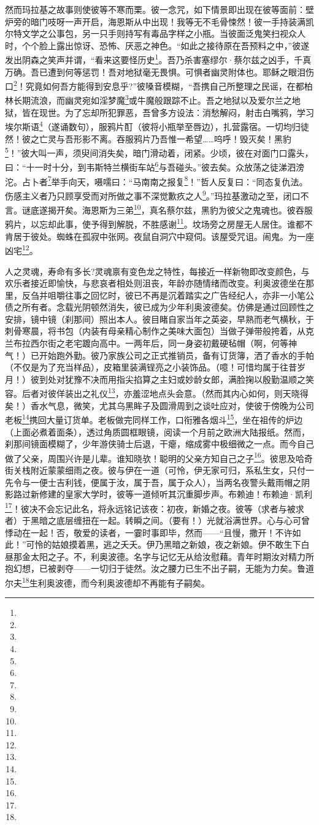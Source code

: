 \par 然而玛拉基之故事则使彼等不寒而栗。彼一念咒，如下情景即出现在彼等面前：壁炉旁的暗门吱呀一声开启，海恩斯从中出现！我等无不毛骨悚然！彼一手持装满凯尔特文学之公事包，另一只手则持写有毒品字样之小瓶。当彼面泛鬼笑扫视众人时，个个脸上露出惊讶、恐怖、厌恶之神色。“如此之接待原在吾预料之中，”彼遂发出阴森之笑声并谓，“看来这要怪历史\footnote{}。吾乃杀害塞缪尔·蔡尔兹之凶手，千真万确。吾已遭到何等惩罚！吾对地狱毫无畏惧。可惧者幽灵附体也。耶稣之眼泪伤口\footnote{}！究竟如何吾方能得到安息乎?”彼嗓音模糊，“吾携自己所整理之民谣，在都柏林长期流浪，而幽灵宛如淫梦魔\footnote{}或牛魔般跟踪不止。吾之地狱以及爱尔兰之地狱，皆在现世。为了忘却所犯罪恶，吾曾多方设法：消愁解闷，射击白嘴鸦，学习埃尔斯语\footnote{}（遂诵数句），服鸦片酊（彼将小瓶举至唇边），扎营露宿。一切均归徒然！彼之亡灵与吾形影不离。吞服鸦片乃吾惟一希望……呜呼！毁灭矣！黑豹\footnote{}！”彼大叫一声，须臾间消失矣，暗门滑动着，闭紧。少顷，彼在对面门口露头，曰：“十一时十分，到韦斯特兰横街车站\footnote{}与吾碰头。”彼去矣。众放荡之徒涕泗滂沱。占卜者\footnote{}举手向天，嗫嚅曰：“马南南之报复\footnote{}！”哲人反复曰：“同态复仇法。伤感主义者乃只顾享受而对所做之事不深觉歉疚之人\footnote{}。”玛拉基激动之至，闭口不言。谜底遂揭开矣。海恩斯为三弟\footnote{}，真名蔡尔兹，黑豹为彼父之鬼魂也。彼吞服鸦片，以忘却此事，使予得到解脱，不胜感谢\footnote{}。坟场旁之房屋无人居住。谁都不肯居于彼处。蜘蛛在孤寂中张网。夜鼠自洞穴中窥伺。该屋受咒诅。闹鬼。为一座凶宅\footnote{}。
\par 人之灵魂，寿命有多长?灵魂禀有变色龙之特性，每接近一样新物即改变颜色，与欢乐者接近即愉快，与悲哀者相处则沮丧，年龄亦随情绪而改变。利奥波德坐在那里，反刍并咀嚼往事之回忆时，彼已不再是沉着踏实之广告经纪人，亦非一小笔公债之所有者。念载光阴顿然消失，彼已成为少年利奥波德矣。仿佛是通过回顾性之安排，镜中镜（刹那间）照出本人。彼目睹自家当年之英姿，早熟而老气横秋，于刺骨寒晨，将书包（内装有母亲精心制作之美味大面包）当做子弹带般挎着，从克兰布拉西尔街之老宅踱向高中。一两年后，同一身姿初戴硬毡帽（啊，何等神气！）已开始跑外勤。彼乃家族公司之正式推销员，备有订货簿，洒了香水的手帕（不仅是为了充当样品），皮箱里装满锃亮之小装饰品。（噫！可惜均属于往昔岁月！）彼到处对犹豫不决而用指尖掐算之主妇或妙龄女郎，满脸掬以殷勤温顺之笑容。后者对彼佯装出之礼仪\footnote{}，亦羞涩地点头会意。（然而其内心如何，则天晓得矣！）香水气息，微笑，尤其乌黑眸子及圆滑周到之谈吐应对，使彼于傍晚为公司老板\footnote{}携回大量订货单。老板做完同样工作，口衔雅各烟斗\footnote{}，坐在祖传的炉边（上面必煮着面条），透过角质圆框眼镜，阅读一个月前之欧洲大陆报纸。然而，刹那间镜面模糊了，少年游侠骑士后退，干瘪，缩成雾中极细微之一点。而今自己做了父亲，周围兴许是儿辈。谁知晓欤！聪明的父亲方知自己之子\footnote{}。彼思及哈奇街关栈附近蒙蒙细雨之夜。彼与伊在一道（可怜，伊无家可归，系私生女，只付一先令与一便士吉利钱，便属于汝，属于吾，属于众人），当两名夜警头戴雨帽之阴影路过新修建的皇家大学时，彼等一道倾听其沉重脚步声。布赖迪！布赖迪·凯利\footnote{}！彼决不会忘记此名，将永远铭记该夜：初夜，新婚之夜。彼等（求者与被求者）于黑暗之底层缠扭在一起。转瞬之间。（要有！）光就浴满世界。心与心可曾悸动在一起！否，敬爱的读者，一霎时事即毕，然而——“且慢，撒开！不许如此！”可怜的姑娘摸着黑，逃之夭夭。伊乃黑暗之新娘，夜之新娘。伊不敢生下白昼那金太阳之子。不，利奥波德。名字与记忆无从给汝慰藉。青年时期汝对精力所抱幻想，已被剥夺——一切归于徒然。汝之腰力已生不出子嗣，无能为力矣。鲁道尔夫\footnote{}生利奥波德，而今利奥波德却不再能有子嗣矣。
